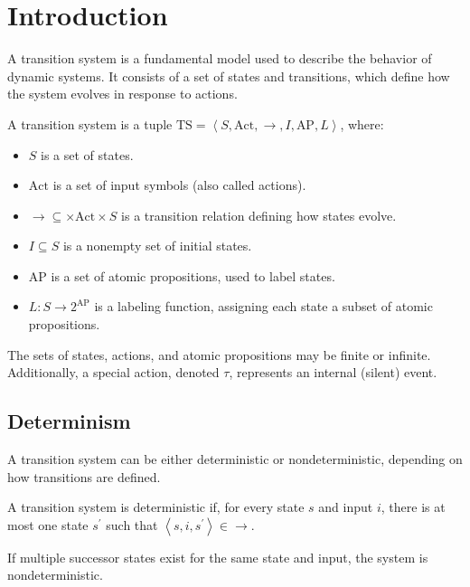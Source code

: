 \section{Introduction}

A transition system is a fundamental model used to describe the behavior of dynamic systems. 
It consists of a set of states and transitions, which define how the system evolves in response to actions.
\begin{definition}
    A transition system is a tuple $\text{TS}=\left\langle S, \text{Act}, \rightarrow, I,\text{AP}, L\right\rangle$, where:
    \begin{itemize}
        \item $S$ is a set of states.
        \item $\text{Act}$ is a set of input symbols (also called actions).
        \item $\rightarrow \subseteq \times \text{Act}\times S$ is a transition relation defining how states evolve.
        \item $I \subseteq S$ is a nonempty set of initial states.
        \item $\text{AP}$ is a set of atomic propositions, used to label states.
        \item $L: S \rightarrow 2^{\text{AP}}$ is a labeling function, assigning each state a subset of atomic propositions.
    \end{itemize}
\end{definition}
The sets of states, actions, and atomic propositions may be finite or infinite. 
Additionally, a special action, denoted $\tau$, represents an internal (silent) event.

\subsection{Determinism}
A transition system can be either deterministic or nondeterministic, depending on how transitions are defined.
\begin{definition}
    A transition system is deterministic if, for every state $s$ and input $i$, there is at most one state $s^\prime$ such that $\left\langle s, i, s^\prime\right\rangle \in\rightarrow$. 
\end{definition}
If multiple successor states exist for the same state and input, the system is nondeterministic.

